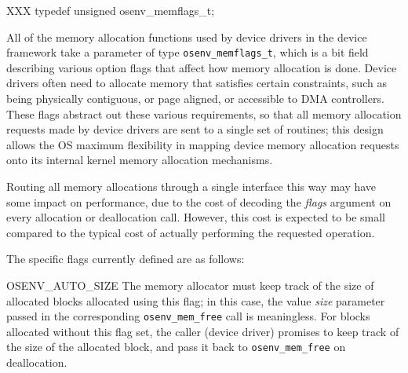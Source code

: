 \begin{apisyn}
	XXX typedef unsigned osenv_memflags_t;
\end{apisyn}
\begin{apidesc}
	All of the memory allocation functions
	used by device drivers in the \oskit{} device framework
	take a parameter of type {\tt osenv_memflags_t},
	which is a bit field describing various option flags
	that affect how memory allocation is done.
	Device drivers often need to allocate memory
	that satisfies certain constraints,
	such as being physically contiguous,
	or page aligned, or accessible to DMA controllers.
	These flags abstract out these various requirements,
	so that all memory allocation requests made by device drivers
	are sent to a single set of routines;
	this design allows the OS maximum flexibility
	in mapping device memory allocation requests
	onto its internal kernel memory allocation mechanisms.

	Routing all memory allocations through a single interface this way
	may have some impact on performance,
	due to the cost of decoding the \emph{flags} argument
	on every allocation or deallocation call.
	However, this cost is expected to be small
	compared to the typical cost
	of actually performing the requested operation.

	The specific flags currently defined are as follows:
	\begin{icsymlist}
	\item[OSENV_AUTO_SIZE]
		The memory allocator must keep track
		of the size of allocated blocks allocated using this flag;
		in this case, the value \emph{size} parameter passed
		in the corresponding {\tt osenv_mem_free} call is meaningless.
		For blocks allocated without this flag set,
		the caller (device driver) promises
		to keep track of the size of the allocated block,
		and pass it back to {\tt osenv_mem_free} on deallocation.


\end{icsymlist}
\end{apidesc}
